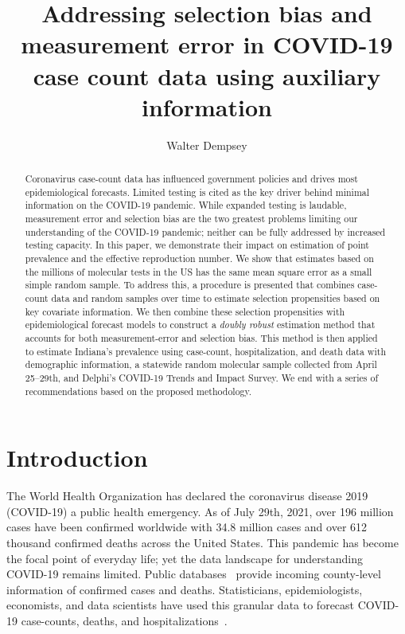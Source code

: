 \documentclass[11pt]{amsart}
\numberwithin{equation}{section}
\theoremstyle{plain}
\begin{document}
\title[Addressing selection bias and measurement error in COVID-19 case counts]{Addressing selection bias and measurement error in COVID-19 case count data using auxiliary information} %

\author{Walter Dempsey}
\address{Department of Biostatistics, University of Michigan, Ann Arbor, MI 48109}

\begin{abstract}
  Coronavirus case-count data has influenced government policies and drives most epidemiological forecasts. Limited testing is cited as the key driver behind minimal information on the COVID-19 pandemic. While expanded testing is laudable, measurement error and selection bias are the two greatest problems limiting our understanding of the COVID-19 pandemic; neither can be fully addressed by increased testing capacity. In this paper, we demonstrate their impact on estimation of point prevalence and the effective reproduction number. We show that estimates based on the millions of molecular tests in the US has the same mean square error as a small simple random sample.  To address this, a procedure is presented that combines case-count data and random samples over time to estimate selection propensities based on key covariate information. We then combine these selection propensities with epidemiological forecast models to construct a \emph{doubly robust} estimation method that accounts for both measurement-error and selection bias.  This method is then applied to estimate Indiana's prevalence using case-count, hospitalization, and death data with demographic information, a statewide random molecular sample collected from April 25--29th, and Delphi's COVID-19 Trends and Impact Survey.  We end with a series of recommendations based on the proposed methodology.
\end{abstract}

\maketitle

\newpage


\section{Introduction}
The World Health Organization has declared the coronavirus disease 2019 (COVID-19) a public health emergency.  As of July 29th, 2021, over 196 million cases have been confirmed worldwide with 34.8 million cases and over 612 thousand confirmed deaths across the United States. This pandemic
has become the focal point of everyday life; yet the data landscape for understanding COVID-19 remains limited.  Public databases~\citep{JHU_Lancet,NYT} provide incoming county-level information of confirmed cases and deaths.  Statisticians, epidemiologists, economists, and data scientists have used this granular data to forecast COVID-19 case-counts, deaths, and hospitalizations~\citep{Giordano2020,Song2020,Ray2020,2020.IHME,Wang2020.03,JTD36385}.
\end{document}
